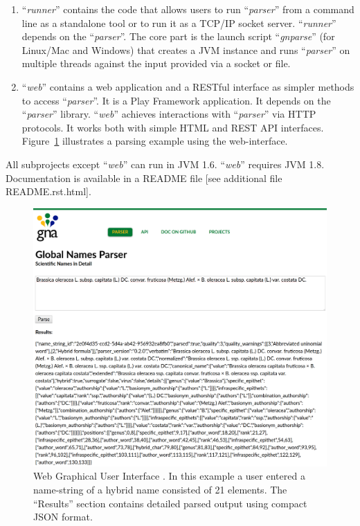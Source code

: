 \documentclass{bmcart}
\begin{document}
\begin{enumerate}
  \item ``\textit{runner}'' contains the code that allows users to run
    ``\textit{parser}'' from a command line as a standalone tool or to run it
    as a TCP/IP socket server. ``\textit{runner}'' depends on the
    ``\textit{parser}''.   The core part is the launch script
    ``\textit{gnparse}'' (for Linux/Mac and Windows) that creates a JVM instance
    and runs ``\textit{parser}'' on multiple threads against the input provided
    via a socket or file.

  \item ``\textit{web}'' contains a web application and a RESTful interface as
    simpler methods to access ``\textit{parser}''. It is a Play Framework
    \cite{wampler2011scala} application. It depends on the ``\textit{parser}''
    library. ``\textit{web}'' achieves interactions with ``\textit{parser}''
    via HTTP protocols. It works both with simple HTML and REST API interfaces.
    Figure~\ref{figure:webgui} illustrates a parsing example using the
    web-interface.

\end{enumerate}

All subprojects except ``\textit{web}'' can run in JVM 1.6. ``\textit{web}''
requires JVM 1.8. Documentation is available in a README file [see additional
file README.rst.html].

\begin{figure}[htbp]
  \begin{center}

    \caption{Web Graphical User Interface \cite{gnparser-web}. In this example
      a user entered a name-string of a hybrid name consisted of 21 elements.
      The ``Results'' section contains detailed parsed output using compact
      JSON format.}\label{figure:webgui}

    \vspace{5mm}
    \includegraphics[scale=0.175]{images/2.png}
  \end{center}
\end{figure}
\end{document}
